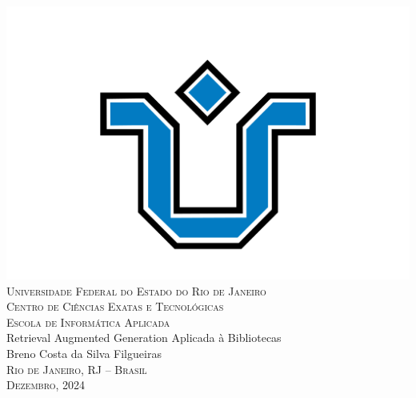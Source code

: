 \documentclass[a4paper, 12pt]{article}
\begin{document}
\setcounter{page}{1}

\thispagestyle{empty}
    \begin{center}
        \includegraphics[scale=0.18]{../images/unirio.png}\\
        \fontsize{13}{15}
        \textsc{
            Universidade Federal do Estado do Rio de Janeiro\\
            Centro de Ciências Exatas e Tecnológicas\\
            Escola de Informática Aplicada\\
        }
        \vspace{2.8cm}
        Retrieval Augmented Generation Aplicada à Bibliotecas\\
        \vspace{2.8cm}
        Breno Costa da Silva Filgueiras
        \vspace*{\fill}\\
        
        \textsc{Rio de Janeiro, RJ -- Brasil\\ Dezembro, 2024}
    \end{center}
    \clearpage
\end{document}
